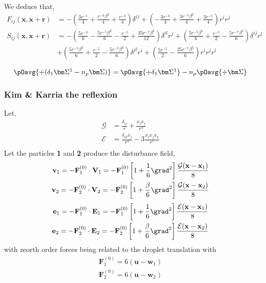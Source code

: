 We deduce that,
\begin{align*}
    F_{ij}(\textbf{x},\textbf{x}+\textbf{r})
    &=
    -\left(\frac{3 r^{-1}}{4} + \frac{r^{-3} \beta^{2}}{4} + \frac{r^{-3}}{4}\right)\delta^{ij} + \left(- \frac{3 r^{-3}}{4} + \frac{3 r^{-5} \beta^{2}}{4} + \frac{3 r^{-5}}{4}\right)r^{i}r^{j}\\
    S_{ij}(\textbf{x},\textbf{x}+\textbf{r})
    &=
    -\left(\frac{5 r^{-3}}{6} - \frac{5 r^{-5} \beta^{2}}{6} - \frac{r^{-5}}{2} + \frac{35 r^{-7} \beta^{2}}{12}\right)\delta^{il}r^{j} 
    + \left(\frac{5 r^{-5} \beta^{2}}{6} + \frac{r^{-5}}{2} - \frac{5 r^{-7} \beta^{2}}{6}\right)\delta^{ij}r^{l} \\
    &+ \left(\frac{5 r^{-5} \beta^{2}}{6} + \frac{r^{-5}}{2} - \frac{5 r^{-7} \beta^{2}}{6}\right)\delta^{jl}r^{i} 
    + \left(\frac{5 r^{-5}}{2} - \frac{25 r^{-7} \beta^{2}}{6}\right)r^{i}r^{j}r^{l}
\end{align*}

\begin{align}
    \pOavg{\div (\delta_1 \bm\Sigma^1-n_p \bm\Sigma)}
    &=
    \pOavg{\div \delta_1 \bm\Sigma^1}
    - n_p\pOavg{\div \bm\Sigma}\\
\end{align}

\subsubsection*{Kim \& Karria the reflexion }

Let, 
\begin{align*}
    \mathcal{G} 
    &= \frac{\delta_{ij}}{r}
    + \frac{x_ix_j}{r^3}\\
    \mathcal{E}
    &= 
    \frac{\delta_{ik}x_j}{r^3}
    - 3\frac{x_ix_jx_k}{r^5}\\
\end{align*}
Let the particles \textbf{1} and \textbf{2} produce the disturbance field, 
\begin{align}
    \textbf{v}_1= - \textbf{F}_1^{(0)}\cdot \textbf{V}_1 = - \textbf{F}_1^{(0)}\left[1+\frac{1}{6}\grad^2 \right]\frac{\mathcal{G}(\textbf{x}-\textbf{x}_1)}{8}\\
    \textbf{v}_2= - \textbf{F}_2^{(0)}\cdot \textbf{V}_2 = - \textbf{F}_2^{(0)}\left[1+\frac{\beta}{6}\grad^2 \right]\frac{\mathcal{G}(\textbf{x}-\textbf{x}_2)}{8}
\end{align}
\begin{align}
    \textbf{e}_1= - \textbf{F}_1^{(0)}\cdot \textbf{E}_1 = - \textbf{F}_1^{(0)}\left[1+\frac{1}{6}\grad^2 \right]\frac{\mathcal{E}(\textbf{x}-\textbf{x}_1)}{8}\\
    \textbf{e}_2= - \textbf{F}_2^{(0)}\cdot \textbf{E}_2 = - \textbf{F}_2^{(0)}\left[1+\frac{\beta}{6}\grad^2 \right]\frac{\mathcal{E}(\textbf{x}-\textbf{x}_2)}{8}
\end{align}
with zeorth order forces being related to the droplet translation with 
\begin{align*}
    \textbf{F}^{(0)}_1 = 6 (\textbf{u} - \textbf{w}_1)\\
    \textbf{F}^{(0)}_2 = 6 (\textbf{u} - \textbf{w}_2)
\end{align*}


